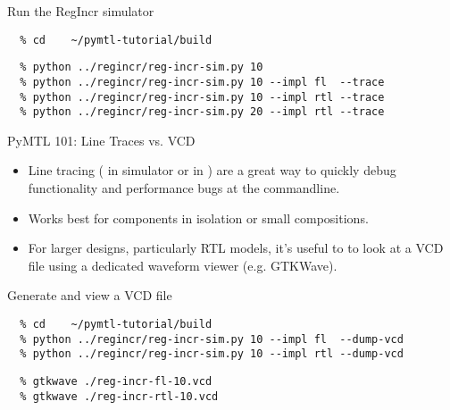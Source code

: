 \begin{task}\begin{frame}[fragile]{Run the RegIncr simulator}
\vspace{-0.25in}
\begin{verbatim}
  % cd    ~/pymtl-tutorial/build
\end{verbatim}

\begin{verbatim}
  % python ../regincr/reg-incr-sim.py 10
  % python ../regincr/reg-incr-sim.py 10 --impl fl  --trace
  % python ../regincr/reg-incr-sim.py 10 --impl rtl --trace
  % python ../regincr/reg-incr-sim.py 20 --impl rtl --trace
\end{verbatim}
\end{frame}
\end{task}

\begin{frame}{PyMTL 101: Line Traces vs. VCD}

\begin{itemize}
\item Line tracing ( in simulator or  in )
      are a great way to quickly debug functionality and performance bugs
      at the commandline.
\item Works best for components in isolation or small compositions.
\item For larger designs, particularly RTL models, it's useful to to look
      at a VCD file using a dedicated waveform viewer (e.g. GTKWave).
\end{itemize}
\end{frame}

\begin{task}\begin{frame}[fragile]{Generate and view a VCD file}
\vspace{-0.25in}
\begin{verbatim}
  % cd    ~/pymtl-tutorial/build
  % python ../regincr/reg-incr-sim.py 10 --impl fl  --dump-vcd
  % python ../regincr/reg-incr-sim.py 10 --impl rtl --dump-vcd
\end{verbatim}

\begin{verbatim}
  % gtkwave ./reg-incr-fl-10.vcd
  % gtkwave ./reg-incr-rtl-10.vcd
\end{verbatim}
\end{frame}
\end{task}

